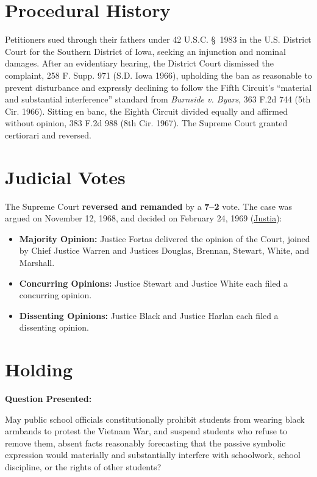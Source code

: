 \documentclass[12pt]{article}
\begin{document}
\section{Procedural History}
Petitioners sued through their fathers under 42 U.S.C. \S~1983 in the U.S. District Court for the Southern District of Iowa, seeking an injunction and nominal damages. After an evidentiary hearing, the District Court dismissed the complaint, 258 F. Supp. 971 (S.D. Iowa 1966), upholding the ban as reasonable to prevent disturbance and expressly declining to follow the Fifth Circuit's ``material and substantial interference'' standard from \textit{Burnside v. Byars}, 363 F.2d 744 (5th Cir. 1966). Sitting en banc, the Eighth Circuit divided equally and affirmed without opinion, 383 F.2d 988 (8th Cir. 1967). The Supreme Court granted certiorari and reversed.

\section{Judicial Votes}
The Supreme Court \textbf{reversed and remanded} by a \textbf{7--2} vote. The case was argued on November 12, 1968, and decided on February 24, 1969 (\href{https://supreme.justia.com/cases/federal/us/393/503/}{Justia}):

\begin{itemize}
    \item \textbf{Majority Opinion:} Justice Fortas delivered the opinion of the Court, joined by Chief Justice Warren and Justices Douglas, Brennan, Stewart, White, and Marshall.
    \item \textbf{Concurring Opinions:} Justice Stewart and Justice White each filed a concurring opinion.
    \item \textbf{Dissenting Opinions:} Justice Black and Justice Harlan each filed a dissenting opinion.
\end{itemize}

\section{Holding}
\textbf{Question Presented:}

May public school officials constitutionally prohibit students from wearing black armbands to protest the Vietnam War, and suspend students who refuse to remove them, absent facts reasonably forecasting that the passive symbolic expression would materially and substantially interfere with schoolwork, school discipline, or the rights of other students?
\end{document}
